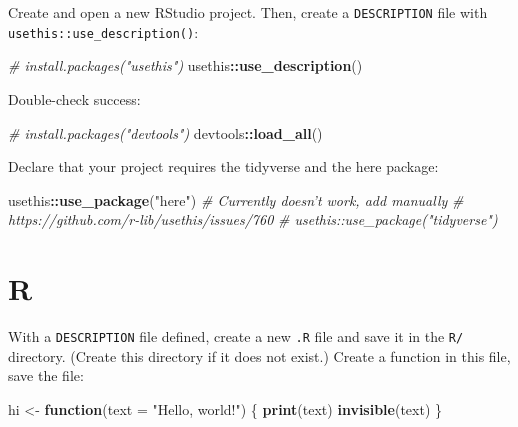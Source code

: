 \documentclass[]{book}
\newenvironment{Shaded}{\begin{snugshade}}{\end{snugshade}}
\newcommand{\CommentTok}[1]{\textcolor[rgb]{0.56,0.35,0.01}{\textit{#1}}}
\newcommand{\ControlFlowTok}[1]{\textcolor[rgb]{0.13,0.29,0.53}{\textbf{#1}}}
\newcommand{\DataTypeTok}[1]{\textcolor[rgb]{0.13,0.29,0.53}{#1}}
\newcommand{\KeywordTok}[1]{\textcolor[rgb]{0.13,0.29,0.53}{\textbf{#1}}}
\newcommand{\NormalTok}[1]{#1}
\newcommand{\OperatorTok}[1]{\textcolor[rgb]{0.81,0.36,0.00}{\textbf{#1}}}
\newcommand{\StringTok}[1]{\textcolor[rgb]{0.31,0.60,0.02}{#1}}
\begin{document}
Create and open a new RStudio project.
Then, create a \texttt{DESCRIPTION} file with \texttt{usethis::use\_description()}:

\begin{Shaded}
\begin{Highlighting}[]
\CommentTok{# install.packages("usethis")}
\NormalTok{usethis}\OperatorTok{::}\KeywordTok{use_description}\NormalTok{()}
\end{Highlighting}
\end{Shaded}

Double-check success:

\begin{Shaded}
\begin{Highlighting}[]
\CommentTok{# install.packages("devtools")}
\NormalTok{devtools}\OperatorTok{::}\KeywordTok{load_all}\NormalTok{()}
\end{Highlighting}
\end{Shaded}

Declare that your project requires the tidyverse and the here package:

\begin{Shaded}
\begin{Highlighting}[]
\NormalTok{usethis}\OperatorTok{::}\KeywordTok{use_package}\NormalTok{(}\StringTok{"here"}\NormalTok{)}
\CommentTok{# Currently doesn't work, add manually}
\CommentTok{# https://github.com/r-lib/usethis/issues/760}
\CommentTok{# usethis::use_package("tidyverse")}
\end{Highlighting}
\end{Shaded}

\hypertarget{r}{%
\section{R}\label{r}}

With a \texttt{DESCRIPTION} file defined, create a new \texttt{.R} file and save it in the \texttt{R/} directory.
(Create this directory if it does not exist.)
Create a function in this file, save the file:

\begin{Shaded}
\begin{Highlighting}[]
\NormalTok{hi <-}\StringTok{ }\ControlFlowTok{function}\NormalTok{(}\DataTypeTok{text =} \StringTok{"Hello, world!"}\NormalTok{) \{}
  \KeywordTok{print}\NormalTok{(text)}
  \KeywordTok{invisible}\NormalTok{(text)}
\NormalTok{\}}
\end{Highlighting}
\end{Shaded}
\end{document}
